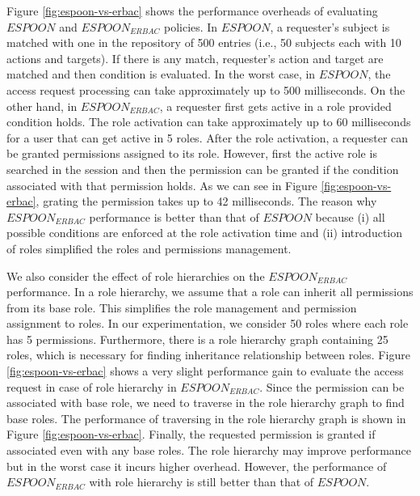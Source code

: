 \documentclass[final,5p,times,twocolumn]{elsarticle}
\begin{document}
Figure \ref{fig:espoon-vs-erbac} shows the performance overheads of evaluating $\mathit{ESPOON}$ and $\mathit{ESPOON_{ERBAC}}$ policies. In $\mathit{ESPOON}$, a requester's subject is matched with one in the repository of 500 entries (i.e., 50 subjects each with 10 actions and targets). If there is any match, requester's action and target are matched and then condition is evaluated. In the worst case, in $\mathit{ESPOON}$, the access request processing can take approximately up to 500 milliseconds. On the other hand, in $\mathit{ESPOON_{ERBAC}}$, a requester first gets active in a role provided condition holds. The role activation can take approximately up to 60 milliseconds for a user that can get active in 5 roles. After the role activation, a requester can be granted permissions assigned to its role. However, first the active role is searched in the session and then the permission can be granted if the condition associated with that permission holds. As we can see in Figure \ref{fig:espoon-vs-erbac}, grating the permission takes up to 42 milliseconds. The reason why $\mathit{ESPOON_{ERBAC}}$ performance is better than that of $\mathit{ESPOON}$ because (i) all possible conditions are enforced at the role activation time and (ii) introduction of roles simplified the roles and permissions management.

We also consider the effect of role hierarchies on the $\mathit{ESPOON_{ERBAC}}$ performance. In a role hierarchy, we assume that a role can inherit all permissions from its base role. This simplifies the role management and permission assignment to roles. In our experimentation, we consider 50 roles where each role has 5 permissions. Furthermore, there is a role hierarchy graph containing 25 roles, which is necessary for finding inheritance relationship between roles. Figure \ref{fig:espoon-vs-erbac} shows a very slight performance gain to evaluate the access request in case of role hierarchy in $\mathit{ESPOON_{ERBAC}}$. Since the permission can be associated with base role, we need to traverse in the role hierarchy graph to find base roles. The performance of traversing in the role hierarchy graph is shown in Figure \ref{fig:espoon-vs-erbac}. Finally, the requested permission is granted if associated even with any base roles. The role hierarchy may improve performance but in the worst case it incurs higher overhead. However, the performance of $\mathit{ESPOON_{ERBAC}}$ with role hierarchy is still better than that of $\mathit{ESPOON}$.
\end{document}
